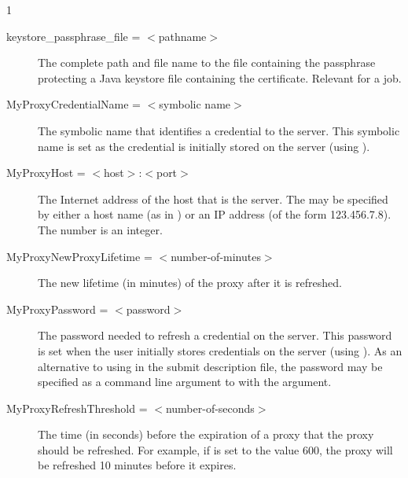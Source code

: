 \begin{ManPage}{\label{man-condor-submit}}{1}
\begin{description}
\item[keystore\_passphrase\_file = $<$pathname$>$]
The complete path and file name
to the file containing the passphrase protecting a Java keystore
file containing the certificate.
Relevant for a  job.


\item[MyProxyCredentialName = $<$symbolic name$>$]
The symbolic name that identifies a credential to the  server.
This symbolic name is set as the credential is
initially stored on the server (using ).



\item[MyProxyHost = $<$host$>$:$<$port$>$]
The Internet address of the host that is the  server.
The  may be specified by either a host name
(as in ) or an IP address
(of the form 123.456.7.8).
The  number is an integer.


\item[MyProxyNewProxyLifetime = $<$number-of-minutes$>$]
The new lifetime (in minutes) of the proxy after it is refreshed.


\item[MyProxyPassword = $<$password$>$]
The password needed to refresh a credential on the  server.
This password is set when the user initially stores
credentials on the server (using ).
As an alternative to using  in the
submit description file,
the password may be specified as a command line argument to 
with the  argument.


\item[MyProxyRefreshThreshold = $<$number-of-seconds$>$]
The time (in seconds) before the expiration of a proxy 
that the proxy should be refreshed.
For example, if  is set to the
value 600, the proxy will be refreshed 10 minutes before
it expires.


\end{description}
\end{ManPage}
